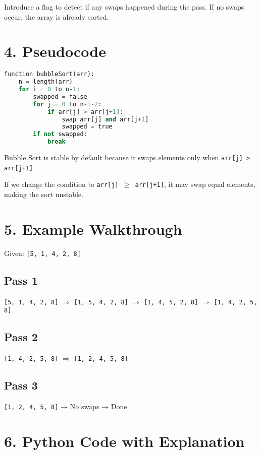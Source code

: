 \documentclass[14pt]{extarticle}
\begin{document}
Introduce a flag to detect if any swaps happened during the pass. If no swaps occur, the array is already sorted.

\section*{4. Pseudocode}

\begin{lstlisting}[language=Python]
function bubbleSort(arr):
    n = length(arr)
    for i = 0 to n-1:
        swapped = false
        for j = 0 to n-i-2:
            if arr[j] > arr[j+1]:
                swap arr[j] and arr[j+1]
                swapped = true
        if not swapped:
            break
\end{lstlisting}

\begin{tcolorbox}[
  colback=white,        %
  colframe=black,       %
  title=Stability Note
]
Bubble Sort is stable by default because it swaps elements only when \texttt{arr[j] > arr[j+1]}.

If we change the condition to \texttt{arr[j] $\geq$ arr[j+1]}, it may swap equal elements, making the sort unstable.
\end{tcolorbox}

\section*{5. Example Walkthrough}

Given: \texttt{[5, 1, 4, 2, 8]}

\subsection*{Pass 1}
\texttt{[5, 1, 4, 2, 8]} $\Rightarrow$ \texttt{[1, 5, 4, 2, 8]}  
$\Rightarrow$ \texttt{[1, 4, 5, 2, 8]}  
$\Rightarrow$ \texttt{[1, 4, 2, 5, 8]}

\subsection*{Pass 2}
\texttt{[1, 4, 2, 5, 8]} $\Rightarrow$ \texttt{[1, 2, 4, 5, 8]}

\subsection*{Pass 3}
\texttt{[1, 2, 4, 5, 8]} → No swaps → Done


\section*{6. Python Code with Explanation}
\end{document}
